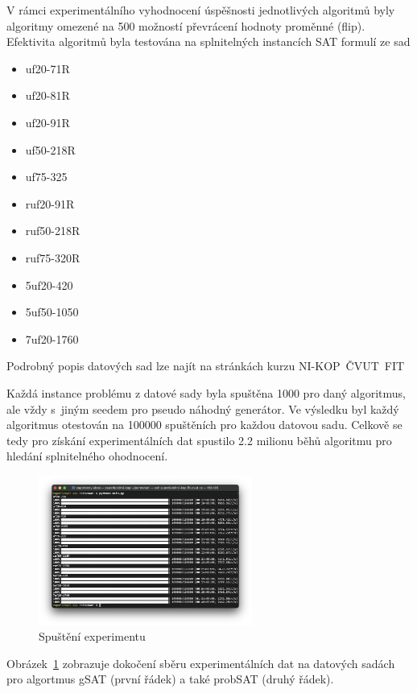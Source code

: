 \documentclass[twoside,twocolumn]{article}
\begin{document}
    V rámci experimentálního vyhodnocení úspěšnosti jednotlivých algoritmů byly algoritmy omezené na 500 možností převrácení hodnoty proměnné (flip).
    Efektivita algoritmů byla testována na splnitelných instancích SAT formulí ze sad

    \begin{itemize}
        \item uf20-71R
        \item uf20-81R
        \item uf20-91R
        \item uf50-218R
        \item uf75-325
        \item ruf20-91R
        \item ruf50-218R
        \item ruf75-320R
        \item 5uf20-420
        \item 5uf50-1050
        \item 7uf20-1760
    \end{itemize}

    Podrobný popis datových sad lze najít na stránkách kurzu NI-KOP~ČVUT~FIT~\cite{coursesData}

    Každá instance problému z datové sady byla spuštěna 1000 pro daný algoritmus, ale vždy s~jiným seedem pro pseudo náhodný generátor.
    Ve výsledku byl každý algoritmus otestován na 100000 spuštěních pro každou datovou sadu.
    Celkově se tedy pro získání experimentálních dat spustilo 2.2 milionu běhů algoritmu pro hledání splnitelného ohodnocení.

    \begin{figure}
        \centering
        \includegraphics[width=7cm]{images/generation}
        \caption{Spuštění experimentu}
        \label{fig:generation}
    \end{figure}

    Obrázek~\ref{fig:generation} zobrazuje dokočení sběru experimentálních dat na datových sadách pro algortmus gSAT (první řádek)
    a také probSAT (druhý řádek).
\end{document}
